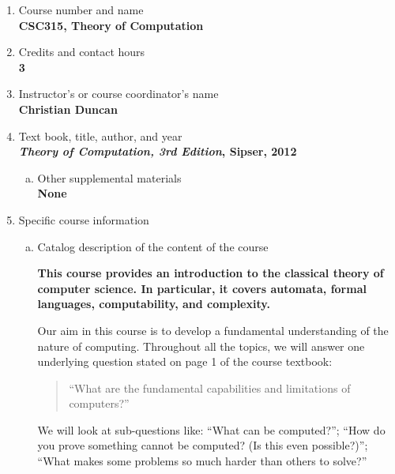 \label{CSC315}  %
\begin{enumerate}[1.]
\item Course number and name\\
  {\bfseries
    CSC315, Theory of Computation
  }
  
\item Credits and contact hours\\
  {\bfseries
    3    
  }

\item Instructor's or course coordinator's name\\
  {\bfseries
    Christian Duncan    
  }

\item Text book, title, author, and year\\
  {\bfseries
    {\em Theory of Computation, 3rd Edition}, Sipser, 2012
  }
\begin{enumerate}[a.]
\item Other supplemental materials\\
  {\bfseries
    None    
  }
\end{enumerate}

\item Specific course information
\begin{enumerate}[a.]  
\item Catalog description of the content of the course\\
  {\bfseries
This course provides an introduction to the classical theory of computer science.
In particular, it covers automata, formal languages, computability, and complexity.

Our aim in this course is to develop a fundamental understanding of the nature of computing.
Throughout all the topics, we will answer one underlying question stated on page 1 of the course textbook:
\begin{quote}
``What are the fundamental capabilities and limitations of computers?''
\end{quote}
We will look at sub-questions like: ``What can be computed?''; ``How do you prove something
cannot be computed?  (Is this even possible?)''; ``What makes some problems so much harder
than others to solve?''
  }


\end{enumerate}
\end{enumerate}
